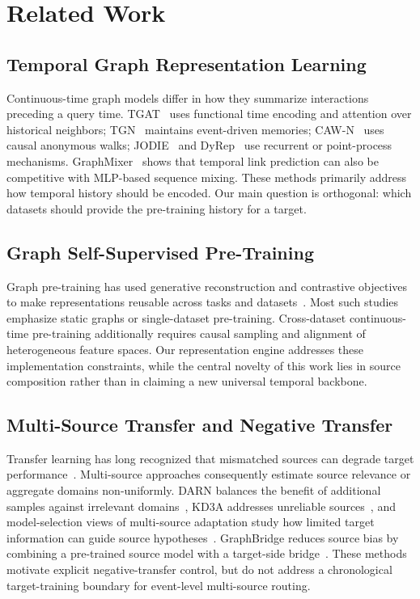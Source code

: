 \documentclass[journal]{IEEEtran}
\begin{document}
\section{Related Work}
\subsection{Temporal Graph Representation Learning}
Continuous-time graph models differ in how they summarize interactions preceding a query time. TGAT~\cite{xu2020inductive} uses functional time encoding and attention over historical neighbors; TGN~\cite{rossi2020temporal} maintains event-driven memories; CAW-N~\cite{wang2021caw} uses causal anonymous walks; JODIE~\cite{kumar2019predicting} and DyRep~\cite{trivedi2019dyrep} use recurrent or point-process mechanisms. GraphMixer~\cite{cong2023graphmixer} shows that temporal link prediction can also be competitive with MLP-based sequence mixing. These methods primarily address how temporal history should be encoded. Our main question is orthogonal: which datasets should provide the pre-training history for a target.

\subsection{Graph Self-Supervised Pre-Training}
Graph pre-training has used generative reconstruction and contrastive objectives to make representations reusable across tasks and datasets~\cite{hu2020gpt,qiu2020gcc,you2020graph,hou2022graphmae}. Most such studies emphasize static graphs or single-dataset pre-training. Cross-dataset continuous-time pre-training additionally requires causal sampling and alignment of heterogeneous feature spaces. Our representation engine addresses these implementation constraints, while the central novelty of this work lies in source composition rather than in claiming a new universal temporal backbone.

\subsection{Multi-Source Transfer and Negative Transfer}
Transfer learning has long recognized that mismatched sources can degrade target performance~\cite{pan2010survey}. Multi-source approaches consequently estimate source relevance or aggregate domains non-uniformly. DARN balances the benefit of additional samples against irrelevant domains~\cite{wen2020darn}, KD3A addresses unreliable sources~\cite{feng2021kd3a}, and model-selection views of multi-source adaptation study how limited target information can guide source hypotheses~\cite{mansour2021msa}. GraphBridge reduces source bias by combining a pre-trained source model with a target-side bridge~\cite{ju2025graphbridge}. These methods motivate explicit negative-transfer control, but do not address a chronological target-training boundary for event-level multi-source routing.
\end{document}
